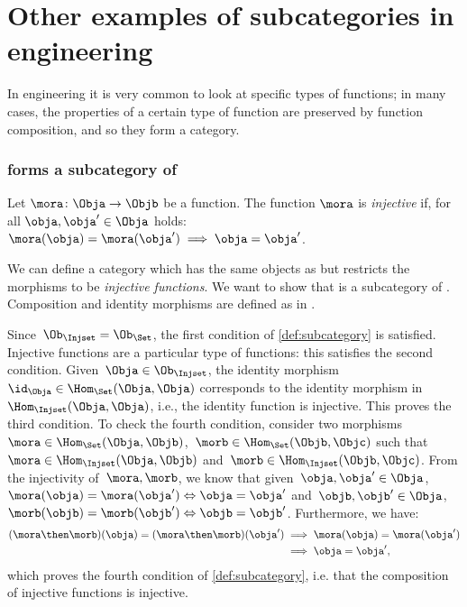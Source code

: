 
\section{Other examples of subcategories in engineering}

In engineering it is very common to look at specific types of functions; in many cases, the properties of a certain type of function are preserved by function composition, and so they form a category.

\subsubsection{\Injset forms a subcategory of \Set}
\begin{definition}
  \label{def:injective-function}
  Let $\mora \colon \Obja\to \Objb$ be a function. The function $\mora$ is \emph{injective} if, for all $\obja,\obja'\in \Obja$ holds: $\mora(\obja)=\mora(\obja')\implies \obja=\obja'$.
\end{definition}


\begin{example}
  We can define a category \Injset which has the same objects as \Set but restricts the morphisms to be \emph{injective functions}.
  We want to show that \Injset is a subcategory of \Set. Composition and identity morphisms are defined as in \Set.

  Since~$\Ob_{\Injset}=\Ob_{\Set}$, the first condition of \cref{def:subcategory} is satisfied. Injective functions are a particular type of functions: this satisfies the second condition. Given~$\Obja\in \Ob_{\Injset}$, the identity morphism~$\id_\Obja\in \Hom_{\Set}(\Obja,\Obja)$ corresponds to the identity morphism in~$\Hom_{\Injset}(\Obja,\Obja)$, i.e., the identity function is injective. This proves the third condition. To check the fourth condition, consider two morphisms~$\mora \in \Hom_\Set(\Obja,\Objb)$,~$\morb \in \Hom_\Set(\Objb,\Objc)$ such that~$\mora \in \Hom_\Injset(\Obja,\Objb)$ and~$\morb\in \Hom_\Injset(\Objb,\Objc)$. From the injectivity of~$\mora,\morb$, we know that given~$\obja,\obja'\in \Obja$, $\mora(\obja)=\mora(\obja') \Leftrightarrow \obja=\obja'$ and~$\objb,\objb'\in \Obja$,~$\morb(\objb)=\morb(\objb') \Leftrightarrow \objb=\objb'$. Furthermore, we have:
  \begin{equation*}
    \begin{aligned}
      (\mora\then \morb)(\obja)=(\mora \then \morb)(\obja')&\implies \mora(\obja)=\mora(\obja')\\
      &\implies \obja=\obja',
    \end{aligned}
  \end{equation*}
  which proves the fourth condition of \cref{def:subcategory}, i.e. that the composition of injective functions is injective.
\end{example}



